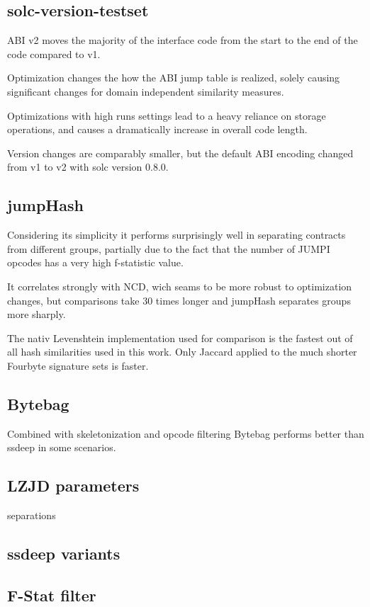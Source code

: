 \documentclass[../main.tex]{subfiles}
\begin{document}
\subsection{solc-version-testset}
ABI v2 moves the majority of the interface code from the start to the end of the code compared to v1.

Optimization changes the how the ABI jump table is realized, solely causing significant changes for domain independent similarity measures.

Optimizations with high runs settings lead to a heavy reliance on storage operations, and causes a dramatically increase in overall code length.

Version changes are comparably smaller, but the default ABI encoding changed from v1 to v2 with solc version 0.8.0.


\subsection{jumpHash}
Considering its simplicity it performs surprisingly well in separating contracts from different groups, partially due to the fact that the number of JUMPI opcodes has a very high f-statistic value.

It correlates strongly with NCD, wich seams to be more robust to optimization changes, but comparisons take 30 times longer and jumpHash separates groups more sharply.


The nativ Levenshtein implementation used for comparison is the fastest out of all hash similarities used in this work. Only Jaccard applied to the much shorter Fourbyte signature sets is faster.


\subsection{Bytebag}
Combined with skeletonization and opcode filtering Bytebag performs better than ssdeep in some scenarios.

\subsection{LZJD parameters}


\begin{table}[ht!]
  \centering

  \caption{separations}
  \label{tbl:lz_sep}
\end{table}


\subsection{ssdeep variants}

\subsection{F-Stat filter}
\end{document}
